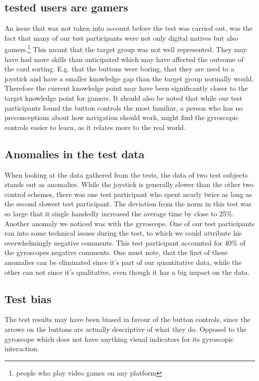 \subsection*{tested users are gamers} \label{TestedUsersAreGamers}
An issue that was not taken into account before the test was carried out, was the fact that many of our test participants were not only digital natives but also gamers.\footnote{people  who play video games on any platform} This meant that the target group was not well represented. They may have had more skills than anticipated which may have affected the outcome of the card sorting. E.g. that the buttons were boring, that they are used to a joystick and have a smaller knowledge gap than the target group normally would. Therefore the current knowledge point may have been significantly closer to the target knowledge point for gamers. 
It should also be noted that while our test participants found the button controls the most familiar, a person who has no preconceptions about how navigation should work, might find the gyroscopic controls easier to learn, as it relates more to the real world. 
\subsection*{Anomalies in the test data}
When looking at the data gathered from the tests, the data of two test subjects stands out as anomalies. While the joystick is generally slower than the other two control schemes, there was one test participant who spent nearly twice as long as the second slowest test participant. 
The deviation from the norm in this test was so large that it single handedly increased the average time by close to 25\%.
Another anomaly we noticed was with the gyroscope. One of our test participants ran into some technical issues during the test, to which we could attribute his overwhelmingly negative comments. This test participant accounted for 40\% of the gyroscopes negative comments.
One must note, that the first of these anomalies can be eliminated since it's part of our quantitative data, while the other can not since it's qualitative, even though it has a big impact on the data.
\subsection*{Test bias}
The test results may have been biased in favour of the button controls, since the arrows on the buttons are actually descriptive of what they do. Opposed to the gyroscope which does not have anything visual indicators for its gyroscopic interaction. 
